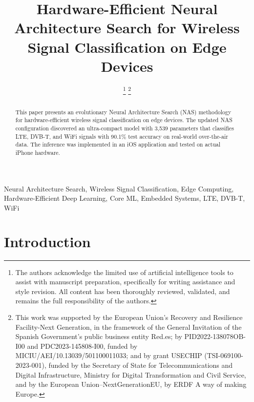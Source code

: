 \documentclass[conference]{IEEEtran}
\begin{document}
\title{Hardware-Efficient Neural Architecture Search for Wireless Signal Classification on Edge Devices}

\author{
\thanks{The authors acknowledge the limited use of artificial intelligence tools to assist with manuscript preparation, specifically for writing assistance and style revision. All content has been thoroughly reviewed, validated, and remains the full responsibility of the authors.}
\thanks{This work was supported by the European Union's Recovery and Resilience Facility-Next Generation, in the framework of the General Invitation of the Spanish Government's public business entity Red.es; by PID2022-138078OB-I00 and PDC2023-145808-I00, funded by MICIU/AEI/10.13039/501100011033; and by grant USECHIP (TSI-069100-2023-001), funded by the Secretary of State for Telecommunications and Digital Infrastructure, Ministry for Digital Transformation and Civil Service, and by the European Union–NextGenerationEU, by ERDF A way of making Europe.}
}

\maketitle

\begin{abstract}
This paper presents an evolutionary Neural Architecture Search (NAS) methodology for hardware-efficient wireless signal classification on edge devices. The updated NAS configuration discovered an ultra-compact model with 3,539 parameters that classifies LTE, DVB-T, and WiFi signals with 90.1\% test accuracy on real-world over-the-air data. The inference was implemented in an iOS application and tested on actual iPhone hardware.
\end{abstract}

\begin{IEEEkeywords}
Neural Architecture Search, Wireless Signal Classification, Edge Computing, Hardware-Efficient Deep Learning, Core ML, Embedded Systems, LTE, DVB-T, WiFi
\end{IEEEkeywords}

\section{Introduction}
\end{document}
